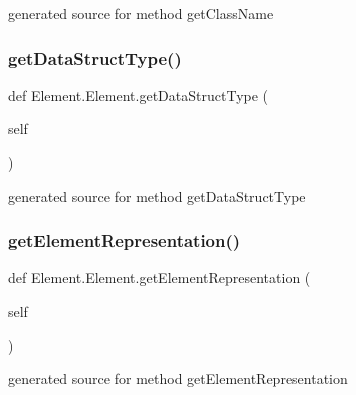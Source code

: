 \begin{DoxyVerb}generated source for method getClassName \end{DoxyVerb}
 \hypertarget{class_element_1_1_element_ad731077bce6c6caede6bdb6609672f68}{}\label{class_element_1_1_element_ad731077bce6c6caede6bdb6609672f68} 
\subsubsection{\texorpdfstring{get\+Data\+Struct\+Type()}{getDataStructType()}}
{\footnotesize\ttfamily def Element.\+Element.\+get\+Data\+Struct\+Type (\begin{DoxyParamCaption}\item[{}]{self }\end{DoxyParamCaption})}

\begin{DoxyVerb}generated source for method getDataStructType \end{DoxyVerb}
 \hypertarget{class_element_1_1_element_a5fa599166de5a0053b235d012fbfc42c}{}\label{class_element_1_1_element_a5fa599166de5a0053b235d012fbfc42c} 
\subsubsection{\texorpdfstring{get\+Element\+Representation()}{getElementRepresentation()}}
{\footnotesize\ttfamily def Element.\+Element.\+get\+Element\+Representation (\begin{DoxyParamCaption}\item[{}]{self }\end{DoxyParamCaption})}

\begin{DoxyVerb}generated source for method getElementRepresentation \end{DoxyVerb}
 \hypertarget{class_element_1_1_element_aac5918af79bb6bd95cf429d1a219901e}{}\label{class_element_1_1_element_aac5918af79bb6bd95cf429d1a219901e} 
